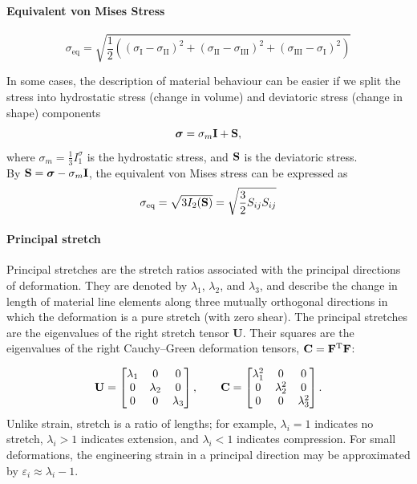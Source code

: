 \documentclass[12pt, a4paper]{article}
\numberwithin{equation}{section}
\begin{document}
\paragraph{Equivalent von Mises Stress}
\begin{equation}
    \sigma_{\mathrm{eq}} = \sqrt{\frac{1}{2} \left( (\sigma_{\mathrm{I}} - \sigma_{\mathrm{II}})^2 + (\sigma_{\mathrm{II}} - \sigma_{\mathrm{III}})^2 + (\sigma_{\mathrm{III}} - \sigma_{\mathrm{I}})^2 \right)}
\end{equation}

In some cases, the description of material behaviour can be easier if we split the stress into hydrostatic stress (change in volume) and deviatoric stress (change in shape) components
\begin{equation}
    \boldsymbol{\sigma} = \sigma_m \mathbf{I} + \mathbf{S},
\end{equation}
where $\sigma_m = \frac{1}{3} I_1^\sigma$ is the hydrostatic stress, and $\mathbf{S}$ is the deviatoric stress. \\

By $\mathbf{S} = \boldsymbol{\sigma} - \sigma_m \mathbf{I}$, the equivalent von Mises stress can be expressed as
\[
    \sigma_{\mathrm{eq}} = \sqrt{3 I_2(\mathbf{S})} = \sqrt{\frac{3}{2} S_{ij} S_{ij}}
\]


\paragraph{Principal stretch} Principal stretches are the stretch ratios associated with the principal directions of deformation. They are denoted by $\lambda_1$, $\lambda_2$, and $\lambda_3$, and describe the change in length of material line elements along three mutually orthogonal directions in which the deformation is a pure stretch (with zero shear). The principal stretches are the eigenvalues of the right stretch tensor $\mathbf{U}$. Their squares are the eigenvalues of the right Cauchy--Green deformation tensors, $\mathbf{C}=\mathbf{F}^{\mathrm{T}}\mathbf{F}$:

\[
    \mathbf{U} =
    \begin{bmatrix}
    \lambda_1 & 0 & 0 \\
    0 & \lambda_2 & 0 \\
    0 & 0 & \lambda_3
    \end{bmatrix},
    \qquad
    \mathbf{C}=
    \begin{bmatrix}
    \lambda_1^2 & 0 & 0 \\
    0 & \lambda_2^2 & 0 \\
    0 & 0 & \lambda_3^2
    \end{bmatrix}.
\]
Unlike strain, stretch is a ratio of lengths; for example, $\lambda_i=1$ indicates no stretch, $\lambda_i>1$ indicates extension, and $\lambda_i<1$ indicates compression. For small deformations, the engineering strain in a principal direction may be approximated by $\varepsilon_i \approx \lambda_i-1$.
\end{document}
